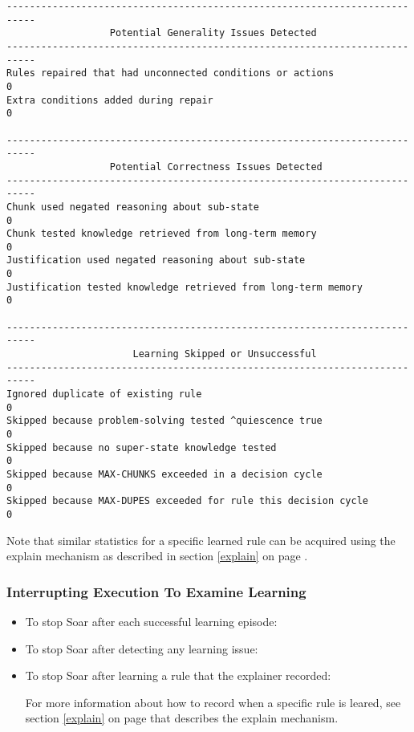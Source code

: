 \begin{center}
{\begin{verbatim}
---------------------------------------------------------------------------
                  Potential Generality Issues Detected
---------------------------------------------------------------------------
Rules repaired that had unconnected conditions or actions              0
Extra conditions added during repair                                   0

---------------------------------------------------------------------------
                  Potential Correctness Issues Detected
---------------------------------------------------------------------------
Chunk used negated reasoning about sub-state                           0
Chunk tested knowledge retrieved from long-term memory                 0
Justification used negated reasoning about sub-state                   0
Justification tested knowledge retrieved from long-term memory         0

---------------------------------------------------------------------------
                      Learning Skipped or Unsuccessful
---------------------------------------------------------------------------
Ignored duplicate of existing rule                                     0
Skipped because problem-solving tested ^quiescence true                0
Skipped because no super-state knowledge tested                        0
Skipped because MAX-CHUNKS exceeded in a decision cycle                0
Skipped because MAX-DUPES exceeded for rule this decision cycle        0
\end{verbatim}
}
\end{center}

Note that similar statistics for a specific learned rule can be acquired using the explain mechanism as described in section \ref{explain} on page \pageref{explain}.

\subsubsection{Interrupting Execution To Examine Learning}

\begin{itemize}
	\item To stop Soar after each successful learning episode: \newline {} 
	\item To stop Soar after detecting any learning issue: \newline {} 
	\item To stop Soar after learning a rule that the explainer recorded: \newline {} 

For more information about how to record when a specific rule is leared, see section \ref{explain} on page \pageref{explain} that describes the explain mechanism.

\end{itemize}


